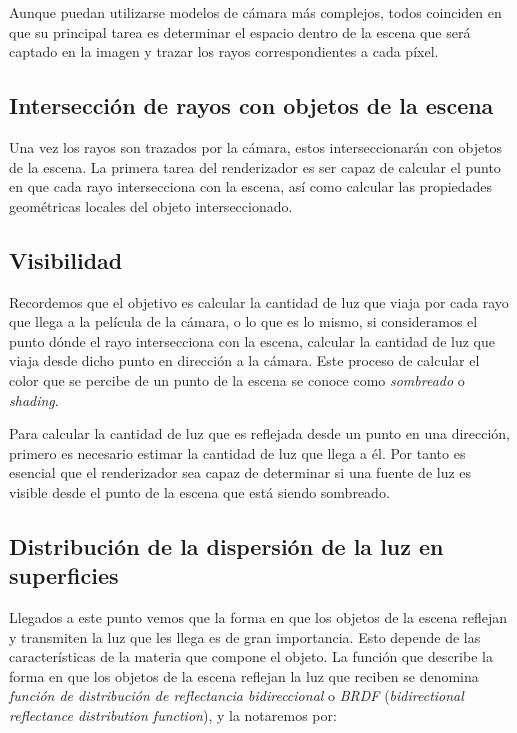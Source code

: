 Aunque puedan utilizarse modelos de cámara más complejos, todos coinciden en que su principal tarea es determinar el espacio dentro de la escena que será captado en la imagen y trazar los rayos correspondientes a cada píxel.

\subsection{Intersección de rayos con objetos de la escena}

Una vez los rayos son trazados por la cámara, estos interseccionarán con objetos de la escena. La primera tarea del renderizador es ser capaz de calcular el punto en que cada rayo intersecciona con la escena, así como calcular las propiedades geométricas locales del objeto interseccionado.

\subsection{Visibilidad}

Recordemos que el objetivo es calcular la cantidad de luz que viaja por cada rayo que llega a la película de la cámara, o lo que es lo mismo, si consideramos el punto dónde el rayo intersecciona con la escena, calcular la cantidad de luz que viaja desde dicho punto en dirección a la cámara. Este proceso de calcular el color que se percibe de un punto de la escena se conoce como \emph{sombreado} o \emph{shading}.

Para calcular la cantidad de luz que es reflejada desde un punto en una dirección, primero es necesario estimar la cantidad de luz que llega a él. Por tanto es esencial que el renderizador sea capaz de determinar si una fuente de luz es visible desde el punto de la escena que está siendo sombreado.

\subsection{Distribución de la dispersión de la luz en superficies}

Llegados a este punto vemos que la forma en que los objetos de la escena reflejan y transmiten la luz que les llega es de gran importancia. Esto depende de las características de la materia que compone el objeto. La función que describe la forma en que los objetos de la escena reflejan la luz que reciben se denomina \emph{función de distribución de reflectancia bidireccional} o \emph{BRDF} (\emph{bidirectional reflectance distribution function}), y la notaremos por:

